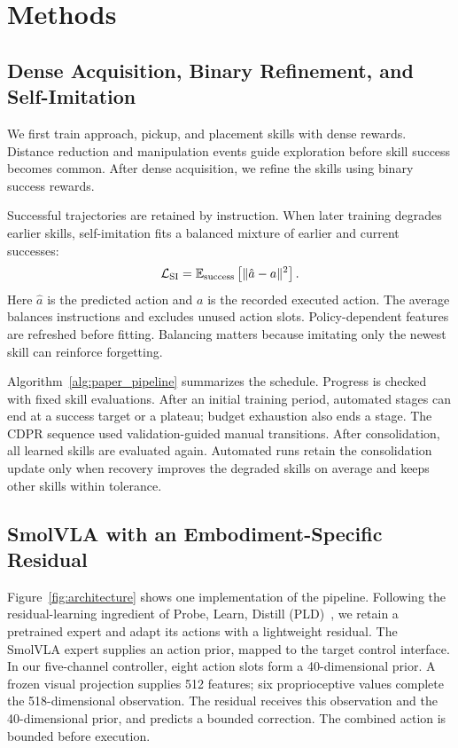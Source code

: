 \section{Methods}\label{sec:method}


\subsection{Dense Acquisition, Binary Refinement, and Self-Imitation}
We first train approach, pickup, and placement skills with dense rewards. Distance reduction and manipulation events guide exploration before skill success becomes common. After dense acquisition, we refine the skills using binary success rewards.

Successful trajectories are retained by instruction. When later training degrades earlier skills, self-imitation fits a balanced mixture of earlier and current successes:
\begin{equation}
\mathcal L_{\rm SI}=\mathbb E_{\rm success}
\left[\|\hat a-a\|^2\right].
\label{eq:si_loss}
\end{equation}
Here $\hat a$ is the predicted action and $a$ is the recorded executed action. The average balances instructions and excludes unused action slots. Policy-dependent features are refreshed before fitting. Balancing matters because imitating only the newest skill can reinforce forgetting.

Algorithm~\ref{alg:paper_pipeline} summarizes the schedule. Progress is checked with fixed skill evaluations. After an initial training period, automated stages can end at a success target or a plateau; budget exhaustion also ends a stage. The CDPR sequence used validation-guided manual transitions. After consolidation, all learned skills are evaluated again. Automated runs retain the consolidation update only when recovery improves the degraded skills on average and keeps other skills within tolerance.


\subsection{SmolVLA with an Embodiment-Specific Residual}
Figure~\ref{fig:architecture} shows one implementation of the pipeline. Following the residual-learning ingredient of Probe, Learn, Distill (PLD)~\cite{pld}, we retain a pretrained expert and adapt its actions with a lightweight residual. The SmolVLA expert supplies an action prior, mapped to the target control interface. In our five-channel controller, eight action slots form a 40-dimensional prior.
A frozen visual projection supplies 512 features; six proprioceptive values complete the 518-dimensional observation. The residual receives this observation and the 40-dimensional prior, and predicts a bounded correction. The combined action is bounded before execution.

